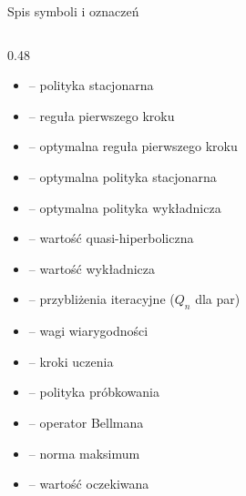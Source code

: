 \documentclass[aspectratio=169]{beamer}
\begin{document}
\begin{frame}{Spis symboli i oznaczeń}
\begin{columns}[T]
        \begin{column}{0.48\textwidth}
            \begin{itemize}
                \setlength{\itemsep}{1pt}
                \item[$\phi_s$] -- polityka stacjonarna
                \item[$\mu$] -- reguła pierwszego kroku
                \item[$\mu^\star$] -- optymalna reguła pierwszego kroku
                \item[$\phi_s^\star$] -- optymalna polityka stacjonarna
                \item[$\phi_\beta^\star$] -- optymalna polityka wykładnicza
                \item[$J_{\phi}^{\alpha,\beta}$] -- wartość quasi-hiperboliczna
                \item[$J_{\phi}^{\beta}$] -- wartość wykładnicza
                \item[$J_n, W_n$] -- przybliżenia iteracyjne ($Q_n$ dla par)
                \item[$\rho_n^J, \rho_n^W$] -- wagi wiarygodności
                \item[$\eta_n, \theta_n$] -- kroki uczenia
                \item[$\nu$] -- polityka próbkowania
                \item[$T^{\phi_s}$] -- operator Bellmana
                \item[$\|\cdot\|_\infty$] -- norma maksimum
                \item[$\mathbb{E}$] -- wartość oczekiwana
            \end{itemize}
        \end{column}
    \end{columns}
\end{frame}
\end{document}
